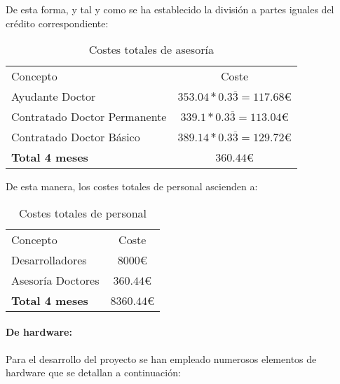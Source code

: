 De esta forma, y tal y como se ha establecido la división a partes iguales del crédito correspondiente: 
\begin{table}[H]
	\begin{center}
		\begin{tabular}{l | c}\hline
			\toprule
			Concepto & Coste\\
			\otoprule
			Ayudante Doctor & $353.04 * 0.3\overline{3} = 117.68$\euro\\
			Contratado Doctor  Permanente & $339.1 * 0.3\overline{3} = 113.04$\euro\\
			Contratado Doctor Básico & $389.14 * 0.3\overline{3} = 129.72$\euro\\
			\hline
			\textbf{Total 4 meses} & $360.44$\euro\\
			\bottomrule
		\end{tabular}
		\caption{Costes totales de asesoría}
		\label{tb:costesAsesoria}
	\end{center}
\end{table}

De esta manera, los costes totales de personal ascienden a: 
\begin{table}[H]
	\begin{center}
		\begin{tabular}{l | c}\hline
			\toprule
			Concepto & Coste\\
			\otoprule
			Desarrolladores & $8000$\euro\\
			Asesoría Doctores & $360.44$\euro\\
			\hline
			\textbf{Total 4 meses} & $8360.44$\euro\\
			\bottomrule
		\end{tabular}
		\caption{Costes totales de personal}
		\label{tb:costesPersonalTotales}
	\end{center}
\end{table}

\paragraph{De hardware:}

Para el desarrollo del proyecto se han empleado numerosos elementos de hardware que se detallan a continuación: 


